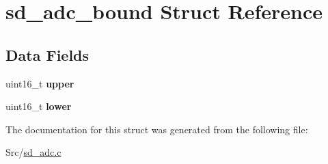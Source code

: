 \hypertarget{structsd__adc__bound}{}\section{sd\+\_\+adc\+\_\+bound Struct Reference}
\label{structsd__adc__bound}
\subsection*{Data Fields}
\begin{DoxyCompactItemize}
\item 
\mbox{\label{structsd__adc__bound_a7f6fe1bfd8cdfb3bc70355253bf2b4e0}} 
uint16\+\_\+t {\bfseries upper}
\item 
\mbox{\label{structsd__adc__bound_aac754cc2a536ae26a69a0a61b77ec56f}} 
uint16\+\_\+t {\bfseries lower}
\end{DoxyCompactItemize}


The documentation for this struct was generated from the following file\+:\begin{DoxyCompactItemize}
\item 
Src/\mbox{\hyperlink{sd__adc_8c}{sd\+\_\+adc.\+c}}\end{DoxyCompactItemize}
